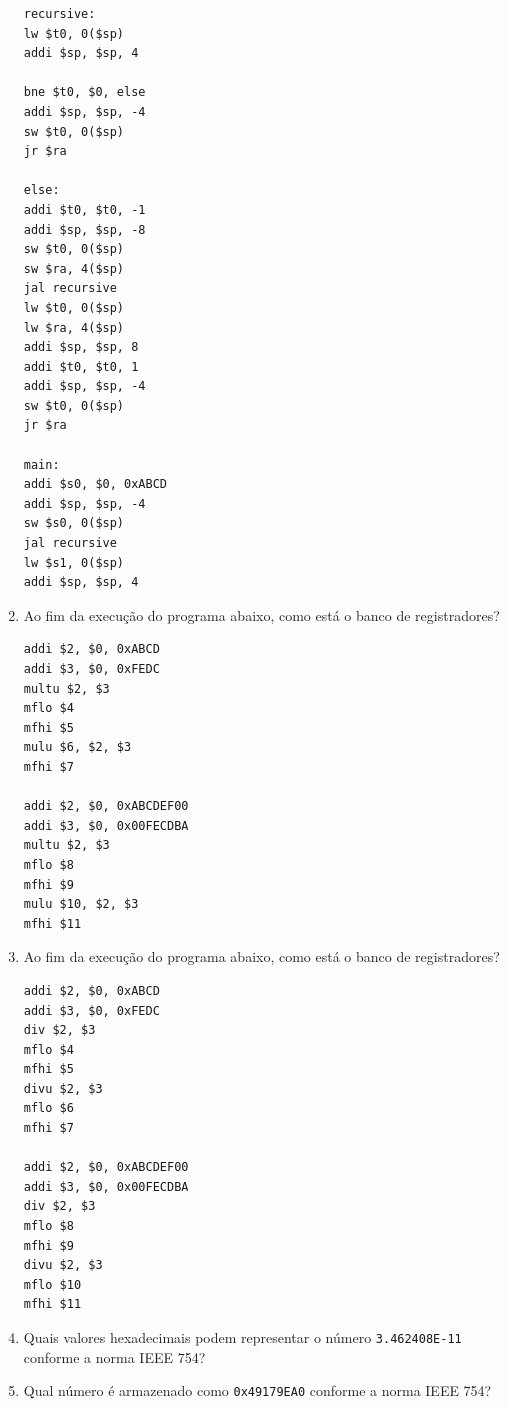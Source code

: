 \documentclass{article}
\begin{document}
\begin{enumerate}
\begin{center}
\begin{minipage}{0.45\textwidth}
\begin{lstlisting}[frame=single]
recursive:
lw $t0, 0($sp)
addi $sp, $sp, 4

bne $t0, $0, else
addi $sp, $sp, -4
sw $t0, 0($sp)
jr $ra

else:
addi $t0, $t0, -1
addi $sp, $sp, -8
sw $t0, 0($sp)
sw $ra, 4($sp)
jal recursive
lw $t0, 0($sp)
lw $ra, 4($sp)
addi $sp, $sp, 8
addi $t0, $t0, 1
addi $sp, $sp, -4
sw $t0, 0($sp)
jr $ra

main:
addi $s0, $0, 0xABCD
addi $sp, $sp, -4
sw $s0, 0($sp)
jal recursive
lw $s1, 0($sp)
addi $sp, $sp, 4
        \end{lstlisting}
    \end{minipage}
\end{center}
\pagebreak
\item Ao fim da execução do programa abaixo, como está o banco de registradores?

\begin{center}
    \begin{minipage}{0.45\textwidth}
        \begin{lstlisting}[frame=single]
addi $2, $0, 0xABCD
addi $3, $0, 0xFEDC
multu $2, $3
mflo $4
mfhi $5
mulu $6, $2, $3
mfhi $7

addi $2, $0, 0xABCDEF00
addi $3, $0, 0x00FECDBA
multu $2, $3
mflo $8
mfhi $9
mulu $10, $2, $3
mfhi $11
        \end{lstlisting}
    \end{minipage}
\end{center}
\item Ao fim da execução do programa abaixo, como está o banco de registradores?

\begin{center}
    \begin{minipage}{0.45\textwidth}
        \begin{lstlisting}[frame=single]
addi $2, $0, 0xABCD
addi $3, $0, 0xFEDC
div $2, $3
mflo $4
mfhi $5
divu $2, $3
mflo $6
mfhi $7 

addi $2, $0, 0xABCDEF00
addi $3, $0, 0x00FECDBA
div $2, $3
mflo $8
mfhi $9
divu $2, $3
mflo $10
mfhi $11
        \end{lstlisting}
    \end{minipage}
\end{center}

\item Quais valores hexadecimais podem representar o número \verb|3.462408E-11| conforme a norma IEEE 754?

\item Qual número é armazenado como \verb|0x49179EA0| conforme a norma IEEE 754?


\end{enumerate}
\end{document}
